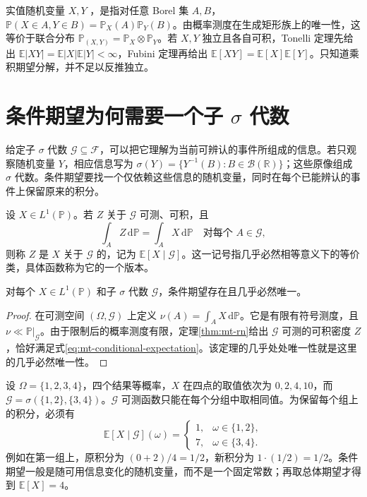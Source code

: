 \documentclass[UTF8,12pt,a4paper,fontset=fandol]{ctexbook}
\begin{document}
实值随机变量 $X,Y$ ，是指对任意 Borel 集 $A,B$，
$\mathbb P(X\in A,Y\in B)=\mathbb P_X(A)\mathbb P_Y(B)$。由概率测度在生成矩形族上的唯一性，这等价于联合分布 $\mathbb P_{(X,Y)}=\mathbb P_X\otimes\mathbb P_Y$。若 $X,Y$ 独立且各自可积，Tonelli 定理先给出 $\mathbb E|XY|=\mathbb E|X|\mathbb E|Y|<\infty$，Fubini 定理再给出 $\mathbb E[XY]=\mathbb E[X]\mathbb E[Y]$。只知道乘积期望分解，并不足以反推独立。

\section{条件期望为何需要一个子 $\sigma$ 代数}
给定子 $\sigma$ 代数 $\mathcal G\subseteq\mathcal F$，可以把它理解为当前可辨认的事件所组成的信息。若只观察随机变量 $Y$，相应信息写为 $\sigma(Y)=\{Y^{-1}(B):B\in\mathcal B(\mathbb R)\}$；这些原像组成 $\sigma$ 代数。条件期望要找一个仅依赖这些信息的随机变量，同时在每个已能辨认的事件上保留原来的积分。

\begin{definition}
设 $X\in L^1(\mathbb P)$。若 $Z$ 关于 $\mathcal G$ 可测、可积，且
\begin{equation}
 \int_AZ\,\mathrm d\mathbb P=\int_AX\,\mathrm d\mathbb P
 \quad\text{对每个 }A\in\mathcal G,
 \label{eq:mt-conditional-expectation}
\end{equation}
则称 $Z$ 是 $X$ 关于 $\mathcal G$ 的，记为 $\mathbb E[X\mid\mathcal G]$。这一记号指几乎必然相等意义下的等价类，具体函数称为它的一个版本。
\end{definition}

\begin{theorem}[条件期望的存在与唯一性]
对每个 $X\in L^1(\mathbb P)$ 和子 $\sigma$ 代数 $\mathcal G$，条件期望存在且几乎必然唯一。
\end{theorem}
\begin{proof}
在可测空间 $(\Omega,\mathcal G)$ 上定义 $\nu(A)=\int_AX\,\mathrm d\mathbb P$。它是有限有符号测度，且 $\nu\ll\mathbb P|_{\mathcal G}$。由于限制后的概率测度有限，定理\ref{thm:mt-rn}给出 $\mathcal G$ 可测的可积密度 $Z$，恰好满足式\eqref{eq:mt-conditional-expectation}。该定理的几乎处处唯一性就是这里的几乎必然唯一性。
\end{proof}

\begin{example}[有限分割上的条件平均]
设 $\Omega=\{1,2,3,4\}$，四个结果等概率，$X$ 在四点的取值依次为 $0,2,4,10$，而 $\mathcal G=\sigma(\{1,2\},\{3,4\})$。$\mathcal G$ 可测函数只能在每个分组中取相同值。为保留每个组上的积分，必须有
\[
 \mathbb E[X\mid\mathcal G](\omega)=
 \begin{cases}
  1,&\omega\in\{1,2\},\\
  7,&\omega\in\{3,4\}.
 \end{cases}
\]
例如在第一组上，原积分为 $(0+2)/4=1/2$，新积分为 $1\cdot(1/2)=1/2$。条件期望一般是随可用信息变化的随机变量，而不是一个固定常数；再取总体期望才得到 $\mathbb E[X]=4$。
\end{example}
\end{document}
